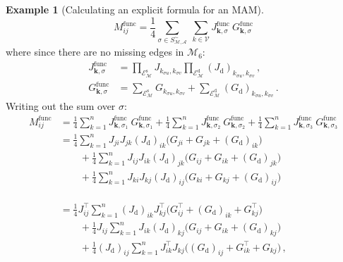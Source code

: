 \documentclass[12pt]{ociamthesis}
\theoremstyle{plain}
\theoremstyle{definition}
\newtheorem{example}{Example}[chapter]
\theoremstyle{remark}
\newcommand\ca[1]{\mathcal{#1}}
\begin{document}
\begin{example}[Calculating an explicit formula for an MAM]
  $$
  M^\mathrm{func}_{i j} = \frac{1}{4} \sum_{\sigma \in S_\ca{M,A}^\sim} \
  \sum_{k \in \ca{V}} J^\mathrm{func}_{\mathbf{k},\sigma} \
  G^\mathrm{func}_{\mathbf{k},\sigma}
  $$
  where since there are no missing edges in $\ca{M}_6$:
  \begin{align*}
    J^\mathrm{func}_{\mathbf{k},\sigma}
    &= \prod_{\ca{E}_\ca{M}^\mathrm{s}} J_{k_{\sigma u},k_{\sigma v}}
    \prod_{\ca{E}_\ca{M}^\mathrm{d}} (J_\mathrm{d})_{k_{\sigma u},k_{\sigma
    v}}\,, \\
    G^\mathrm{func}_{\mathbf{k},\sigma}
    &= \sum_{\ca{E}_\ca{M}^\mathrm{s}} G_{k_{\sigma u},k_{\sigma v}}
    + \sum_{\ca{E}_\ca{M}^\mathrm{d}} (G_\mathrm{d})_{k_{\sigma u},k_{\sigma
    v}}\,.
  \end{align*}
  Writing out the sum over $\sigma$:
  \begingroup
  \allowdisplaybreaks
  \begin{align*}
    M^\mathrm{func}_{i j}
    &= \frac{1}{4} \sum_{k=1}^n J^\mathrm{func}_{\mathbf{k},\sigma_1} \
    G^\mathrm{func}_{\mathbf{k},\sigma_1} + \frac{1}{4} \sum_{k=1}^n
    J^\mathrm{func}_{\mathbf{k},\sigma_2} \
    G^\mathrm{func}_{\mathbf{k},\sigma_2} + \frac{1}{4} \sum_{k=1}^n
    J^\mathrm{func}_{\mathbf{k},\sigma_3} \
    G^\mathrm{func}_{\mathbf{k},\sigma_3} \\
    &=         \frac{1}{4} \sum_{k=1}^n J_{j i} J_{j k} (J_\mathrm{d})_{i k}
    \big(G_{j i} + G_{j k} + (G_\mathrm{d})_{i k}\big) \\
    & \qquad + \frac{1}{4} \sum_{k=1}^n J_{i j} J_{i k} (J_\mathrm{d})_{j k}
    \big(G_{i j} + G_{i k} + (G_\mathrm{d})_{j k}\big) \\
    & \qquad + \frac{1}{4} \sum_{k=1}^n J_{k i} J_{k j} (J_\mathrm{d})_{i j}
    \big(G_{k i} + G_{k j} + (G_\mathrm{d})_{i j}\big) \\
    & \\
    & \\
    & \\
    &=         \frac{1}{4} J^\top_{i j} \sum_{k=1}^n (J_\mathrm{d})_{i k}
    J^\top_{k j} \big(G^\top_{i j} + (G_\mathrm{d})_{i k} + G^\top_{k j}\big) \\
    & \qquad + \frac{1}{4} J_{i j} \sum_{k=1}^n J_{i k}
    (J_\mathrm{d})_{k j} \big(G_{i j} + G_{i k} + (G_\mathrm{d})_{k j}\big) \\
    & \qquad + \frac{1}{4} (J_\mathrm{d})_{i j}
    \sum_{k=1}^n J^\top_{i k} J_{k j}
    \big((G_\mathrm{d})_{i j} + G^\top_{i k} + G_{k j}\big) \,,
  \end{align*}

\end{example}
\end{document}
